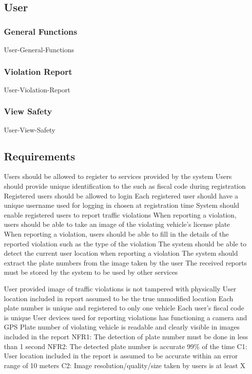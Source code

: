 \subsection{User}

\subsubsection{General Functions}

{User-General-Functions}

\subsubsection{Violation Report}

{User-Violation-Report}

\subsubsection{View Safety}

{User-View-Safety}

\subsection{Requirements}

\textbf{}
\begin{itemize}
\require Users should be allowed to register to services provided by the system
\require Users should provide unique identification to the such as fiscal code during registration
\require Registered users should be allowed to login
\require Each registered user should have a unique username used for logging in chosen at registration time
\require System should enable registered users to report traffic violations
\require When reporting a violation, users should be able to take an image of the violating vehicle’s license plate
\require When reporting a violation, users should be able to fill in the details of the reported violation such as the type of the violation
\require The system should be able to detect the current user location when reporting a violation
\require The system should extract the plate numbers from the image taken by the user
\require The received reports must be stored by the system to be used by other services 
\end{itemize}

\begin{itemize}
\domain User provided image of traffic violations is not tampered with physically
\domain User location included in report assumed to be the true unmodified location
\domain Each plate number is unique and registered to only one vehicle
\domain Each user’s fiscal code is unique
\domain User devices used for reporting violations has functioning a camera and GPS
\domain Plate number of violating vehicle is readable and clearly visible in images included in the report
NFR1: The detection of plate number must be done in less than 1 second
NFR2: The detected plate number is accurate 99\% of the time
C1: User location included in the report is assumed to be accurate within an error range of 10 meters
C2: Image resolution/quality/size taken by users is at least X
\end{itemize}

